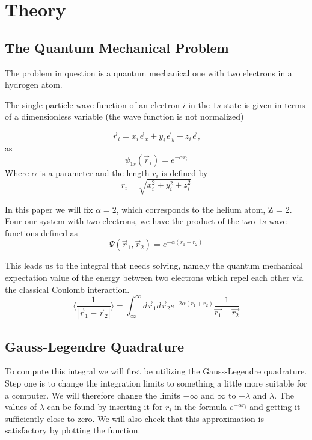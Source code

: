 \documentclass[../main.tex]{subfiles}
\begin{document}
\section{Theory} \label{sec:theory}
\subsection{The Quantum Mechanical Problem} \label{sec:QMProb}
The problem in question is a quantum mechanical one with two electrons in a hydrogen atom.

The single-particle wave function of an electron $i$ in the $1s$ state is given in terms of a dimensionless variable (the wave function is not normalized)

\[\vec{r}_i = x_i \vec{e}_x + y_i \vec{e}_y + z_i \vec{e}_z\]
as
\[\psi_{1s}(\vec{r}_i) = e^{-\alpha r_i}\]
Where $\alpha$ is a parameter and the length $r_i$ is defined by
\[r_i = \sqrt{x_i^2 + y_i^2 + z_i^2}\]

In this paper we will fix $\alpha = 2$, which corresponds to the helium atom, Z = 2.\\

Four our system with two electrons, we have the product of the two $1s$ wave functions defined as
\[\Psi(\vec{r}_1, \vec{r}_2) = e^{-\alpha(r_1 + r_2)}\]

This leads us to the integral that needs solving, namely the quantum mechanical expectation value of the energy between two electrons which repel each other via the classical Coulomb interaction.
\[\langle \frac{1}{|\vec{r}_1 - \vec{r}_2|} \rangle = \int_{\infty}^\infty d\vec{r}_1 d\vec{r}_2 e^{-2\alpha(r_1 + r_2)} \frac{1}{\vec{r_1} - \vec{r_2}}\]



\subsection{Gauss-Legendre Quadrature} \label{sec:GLQ}
To compute this integral we will first be utilizing the Gauss-Legendre quadrature. Step one is to change the integration limits to something a little more suitable for a computer. We will therefore change the limits $-\infty$ and $\infty$ to $-\lambda$ and $\lambda$. The values of $\lambda$ can be found by inserting it for $r_i$ in the formula $e^{-\alpha r_i}$ and getting it sufficiently close to zero.  We will also check that this approximation is satisfactory by plotting the function.
\end{document}

